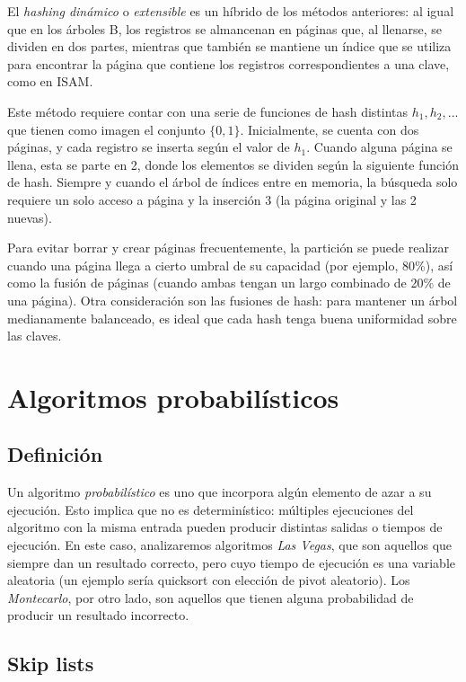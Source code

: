 \documentclass{article}
\begin{document}
El \textit{hashing dinámico} o \textit{extensible} es un híbrido de los métodos anteriores: al igual que en los árboles B, los registros se almancenan en páginas que, al llenarse, se dividen en dos partes, mientras que también se mantiene un índice que se utiliza para encontrar la página que contiene los registros correspondientes a una clave, como en ISAM.

Este método requiere contar con una serie de funciones de hash distintas $h_1, h_2, ...$ que tienen como imagen el conjunto $\{0, 1\}$. Inicialmente, se cuenta con dos páginas, y cada registro se inserta según el valor de $h_1$. Cuando alguna página se llena, esta se parte en 2, donde los elementos se dividen según la siguiente función de hash. Siempre y cuando el árbol de índices entre en memoria, la búsqueda solo requiere un solo acceso a página y la inserción 3 (la página original y las 2 nuevas).

Para evitar borrar y crear páginas frecuentemente, la partición se puede realizar cuando una página llega a cierto umbral de su capacidad (por ejemplo, 80\%), así como la fusión de páginas (cuando ambas tengan un largo combinado de 20\% de una página). Otra consideración son las fusiones de hash: para mantener un árbol medianamente balanceado, es ideal que cada hash tenga buena uniformidad sobre las claves.

\section{Algoritmos probabilísticos}

\subsection{Definición}

Un algoritmo \textit{probabilístico} es uno que incorpora algún elemento de azar a su ejecución. Esto implica que no es determinístico: múltiples ejecuciones del algoritmo con la misma entrada pueden producir distintas salidas o tiempos de ejecución. En este caso, analizaremos algoritmos \textit{Las Vegas}, que son aquellos que siempre dan un resultado correcto, pero cuyo tiempo de ejecución es una variable aleatoria (un ejemplo sería quicksort con elección de pivot aleatorio). Los \textit{Montecarlo}, por otro lado, son aquellos que tienen alguna probabilidad de producir un resultado incorrecto.

\subsection{Skip lists}
\end{document}
